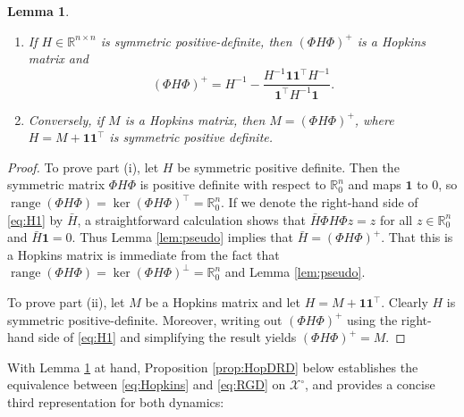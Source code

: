 \documentclass[reqno]{amsart}
\theoremstyle{plain}
\newtheorem{lemma}[theorem]{Lemma}
\theoremstyle{definition}
\theoremstyle{remark}
\numberwithin{equation}{section}
\numberwithin{theorem}{section}
\begin{document}
\begin{lemma}
\label{lem:HBoth}
\leavevmode
\begin{enumerate}
\item
If ${H}\in{{\mathbb{R}}^{n\times n}}$ is symmetric positive-definite, then $({\Phi}{H}{\Phi})^{+}$ is a Hopkins matrix and
\begin{equation}
\label{eq:H1}
({\Phi}{H}{\Phi})^{+}
	= {H}^{-1} - \frac{{H}^{-1}{\mathbf{1}}{\mathbf{1}}^{{\!\top}}{H}^{-1}}{{\mathbf{1}}^{{\!\top}}{H}^{-1}{\mathbf{1}}}.
\end{equation}
\item 
Conversely, if  ${M}$ is a Hopkins matrix, then ${M} = ({\Phi}{H}{\Phi})^+$, where ${H} = {M} +{\mathbf{1}}{\mathbf{1}}^{{\!\top}}$ is symmetric positive definite.
\end{enumerate}
\end{lemma}

\begin{proof}
To prove part (i), let ${H}$ be symmetric positive definite. Then the symmetric matrix  $\Phi {H} \Phi $ is positive definite with respect to ${{\mathbb{R}}_{0}^{n}}$ and maps ${\mathbf{1}}$ to 0, so $\operatorname{range}(\Phi {H} \Phi)=\ker(\Phi {H} \Phi)^{{\!\top}}= {{\mathbb{R}}_{0}^{n}}$.
If we denote the right-hand side of \eqref{eq:H1} by $\bar{H}$,
a straightforward calculation shows that $\bar{H} \Phi {H} \Phi z = z$ for all $z \in {{\mathbb{R}}_{0}^{n}}$ and $\bar{H}{\mathbf{1}} = 0$.  Thus Lemma \ref{lem:pseudo} implies that $\bar{H}=({\Phi}{H}{\Phi})^+$.  That this is a Hopkins matrix is immediate from the fact that $\operatorname{range}(\Phi {H} \Phi)=\ker(\Phi {H} \Phi)^\bot= {{\mathbb{R}}_{0}^{n}}$ and Lemma \ref{lem:pseudo}.

To prove part (ii), let ${M}$ be a Hopkins matrix and let ${H} = {M} +{\mathbf{1}}{\mathbf{1}}^{{\!\top}}$.  Clearly ${H}$ is symmetric positive-definite.
Moreover, writing out $({\Phi}{H}{\Phi})^+$ using the right-hand side of  \eqref{eq:H1} and simplifying the result yields  $({\Phi}{H}{\Phi})^+={M}$.
\end{proof}

With Lemma \ref{lem:HBoth} at hand, Proposition \ref{prop:HopDRD} below establishes the equivalence between \eqref{eq:Hopkins} and \eqref{eq:RGD} on ${{\mathcal{X}}^{\circ}}$, and provides a concise third representation for both dynamics:
\end{document}
